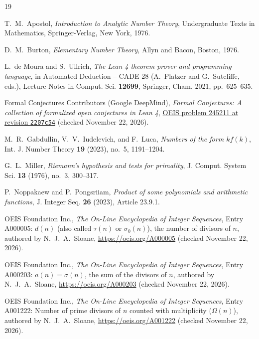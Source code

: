 \documentclass[11pt,reqno]{amsart}
\theoremstyle{plain}
\theoremstyle{definition}
\theoremstyle{remark}
\begin{document}
\FloatBarrier
\begin{thebibliography}{19}

T.~M.~Apostol, \emph{Introduction to Analytic Number Theory}, Undergraduate Texts in Mathematics, Springer-Verlag, New York, 1976.

D.~M.~Burton, \emph{Elementary Number Theory}, Allyn and Bacon, Boston, 1976.

L.~de Moura and S.~Ullrich, \emph{The Lean 4 theorem prover and programming language}, in Automated Deduction -- CADE 28 (A.~Platzer and G.~Sutcliffe, eds.), Lecture Notes in Comput. Sci. \textbf{12699}, Springer, Cham, 2021, pp.~625--635.

Formal Conjectures Contributors (Google DeepMind), \emph{Formal Conjectures: A collection of formalized open conjectures in Lean 4}, \href{https://github.com/google-deepmind/formal-conjectures/blob/2207c54d0dbe960de591d280f997b195bf3f6e28/FormalConjectures/OEIS/245211.lean}{OEIS problem 245211 at revision \texttt{2207c54}} (checked November 22, 2026).

M.~R.~Gabdullin, V.~V.~Iudelevich, and F.~Luca, \emph{Numbers of the form $k f(k)$}, Int. J. Number Theory \textbf{19} (2023), no.~5, 1191--1204.

G.~L.~Miller, \emph{Riemann's hypothesis and tests for primality}, J. Comput. System Sci. \textbf{13} (1976), no.~3, 300--317.

P.~Noppakaew and P.~Pongsriiam, \emph{Product of some polynomials and arithmetic functions}, J. Integer Seq. \textbf{26} (2023), Article 23.9.1.

OEIS Foundation Inc., \emph{The On-Line Encyclopedia of Integer Sequences}, Entry A000005: $d(n)$ (also called $\tau(n)$ or $\sigma_0(n)$), the number of divisors of $n$, authored by N.~J.~A.~Sloane, \url{https://oeis.org/A000005} (checked November 22, 2026).

OEIS Foundation Inc., \emph{The On-Line Encyclopedia of Integer Sequences}, Entry A000203: $a(n) = \sigma(n)$, the sum of the divisors of $n$, authored by N.~J.~A.~Sloane, \url{https://oeis.org/A000203} (checked November 22, 2026).

OEIS Foundation Inc., \emph{The On-Line Encyclopedia of Integer Sequences}, Entry A001222: Number of prime divisors of $n$ counted with multiplicity ($\Omega(n)$), authored by N.~J.~A.~Sloane, \url{https://oeis.org/A001222} (checked November 22, 2026).


\end{thebibliography}
\end{document}
